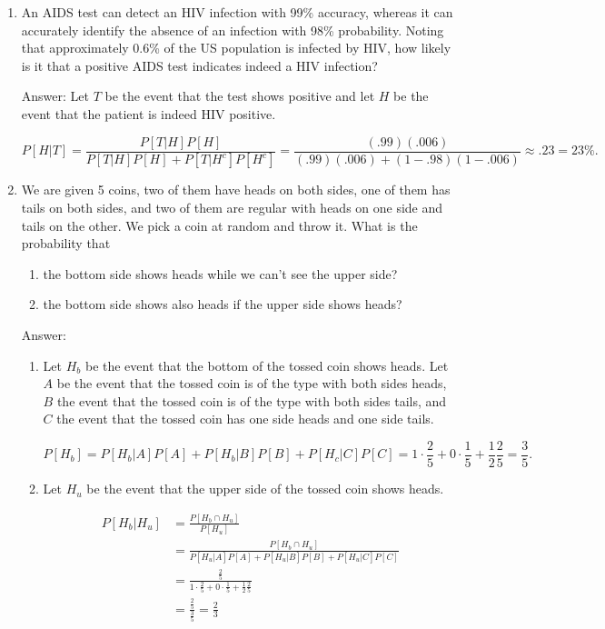 \documentclass{article}
\begin{document}
\begin{enumerate}
\begin{enumerate}
\end{enumerate}

\newpage
\item

An AIDS test can detect an HIV infection with 99\% accuracy, whereas it can accurately identify the absence of an infection with 98\% probability.  Noting that approximately 0.6\% of the US population is infected by HIV, how likely is it that a positive AIDS test indicates indeed a HIV infection?

Answer: Let $T$ be the event that the test shows positive and let $H$ be the event that the patient is indeed HIV positive. 

$$
P[H | T] = \frac{P[T | H] P[H]}{P[T|H]P[H] + P[T|H^c]P[H^c]}
= \frac{(.99)(.006)}{(.99)(.006) + (1-.98)(1-.006)}
\approx .23 = 23\%.
$$


\item

We are given 5 coins, two of them have heads on both sides, one of them has tails on both sides, and two of them are regular with heads on one side and tails on the other.  We pick a coin at random and throw it.  What is the probability that


\begin{enumerate}
\item 
the bottom side shows heads while we can't see the upper side?

\item
the bottom side shows also heads if the upper side shows heads?
\end{enumerate}

Answer:

\begin{enumerate}
\item Let $H_b$ be the event that the bottom of the tossed coin shows heads. Let $A$ be the event that the tossed coin is of the type with both sides heads, $B$ the event that the tossed coin is of the type with both sides tails, and $C$ the event that the tossed coin has one side heads and one side tails. 

$$
P[H_b] = P[H_b | A]P[A] + P[H_b | B]P[B] + P[H_c | C]P[C]
= 1 \cdot \frac{2}{5} + 0 \cdot \frac{1}{5} + \frac{1}{2} \frac{2}{5} = \frac{3}{5}.
$$

\item

Let $H_u$ be the event that the upper side of the tossed coin shows heads.

\begin{align*}
P[H_b | H_u] &= \frac{P[H_b \cap H_u]}{P[H_u]} \\
&= \frac{P[H_b \cap H_u]}{P[H_u | A]P[A] + P[H_u|B]P[B] + P[H_u|C]P[C]} \\
&= \frac{\frac{2}{5}}{1 \cdot \frac{2}{5} + 0\cdot \frac{1}{5} + \frac{1}{2} \frac{2}{5}} \\
&=\frac{\frac{2}{5}}{\frac{3}{5}} = \frac{2}{3}
\end{align*}



\end{enumerate}
\end{enumerate}
\end{document}
